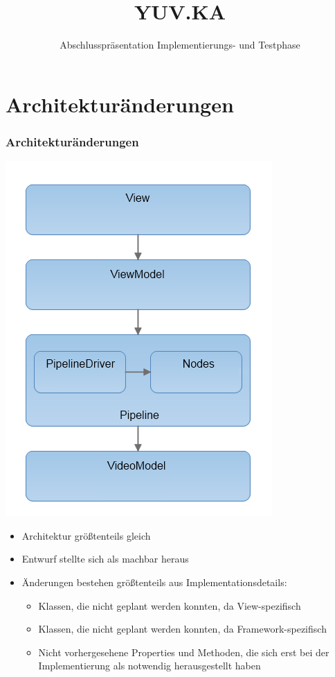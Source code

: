 \documentclass[t]{beamer}
\title{YUV.KA}
\subtitle{Abschlusspräsentation Implementierungs- und Testphase}
\institute[ITEC]{Institut für Technische Informatik}
\begin{document}
\begin{frame}
\maketitle
\end{frame}
 
\section{Architekturänderungen}
\begin{frame}
    \frametitle{Architekturänderungen}
    \noindent
    \begin{minipage}{3.5cm}
        \includegraphics[scale=0.37]{images/Layers.png}
    \end{minipage}
    \hfill
    \begin{minipage}{8cm}
    \begin{itemize}
        \item Architektur größtenteils gleich
        \item Entwurf stellte sich als machbar heraus
        \item Änderungen bestehen größtenteils aus Implementationsdetails:
        \begin{itemize}
            \item Klassen, die nicht geplant werden konnten, da View-spezifisch
            \item Klassen, die nicht geplant werden konnten, da Framework-spezifisch
            \item Nicht vorhergesehene Properties und Methoden, die sich erst bei der Implementierung als notwendig herausgestellt haben
        \end{itemize}
    \end{itemize}
    \end{minipage}
\end{frame}
\end{document}
